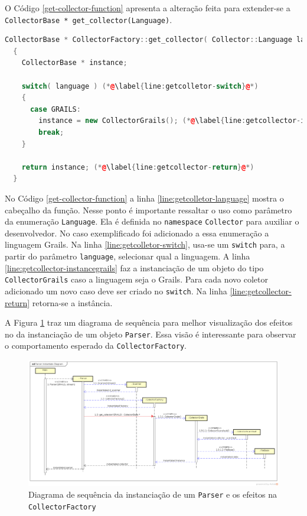 O Código \ref{get-collector-function} apresenta a alteração feita para extender-se
a \lstinline|CollectorBase * get_collector(Language)|.

\begin{lstlisting}[language=C++, label=get-collector-function, caption=Implementação e extensão da \lstinline{get_collector(Language)}]
CollectorBase * CollectorFactory::get_collector( Collector::Language language ) (*@\label{line:getcolletor-language}@*)
  {
    CollectorBase * instance;

    switch( language ) (*@\label{line:getcolletor-switch}@*)
    {
      case GRAILS:
        instance = new CollectorGrails(); (*@\label{line:getcollector-instancegrails}@*)
        break;
    }

    return instance; (*@\label{line:getcollector-return}@*)
  }
\end{lstlisting}

No Código \ref{get-collector-function} a linha \ref{line:getcolletor-language}
mostra o cabeçalho da função. Nesse ponto é importante ressaltar o uso como
parâmetro da enumeração \lstinline|Language|. Ela é definida no \lstinline|namespace|
\lstinline|Collector| para auxiliar o desenvolvedor. No caso exemplificado foi
adicionado a essa enumeração a linguagem \textsf{Grails}. Na linha
\ref{line:getcolletor-switch}, usa-se um \lstinline|switch| para, a partir do parâmetro
\lstinline|language|, selecionar qual a linguagem. A linha
\ref{line:getcollector-instancegrails} faz a instanciação de um objeto do tipo
\lstinline|CollectorGrails| caso a linguagem seja o \textsf{Grails}. Para cada novo
coletor adicionado um novo caso deve ser criado no \lstinline|switch|. Na linha
\ref{line:getcollector-return} retorna-se a instância.

A Figura \ref{parser-instance-sequence-diagram} traz um diagrama de sequência para melhor
visualização dos efeitos no \scarefault da instanciação de um objeto \lstinline|Parser|.
Essa visão é interessante para observar o comportamento esperado da
\lstinline|CollectorFactory|.
\begin{landscape}
\begin{figure}[h]
  \centering
    \includegraphics[width=1.5\textwidth]{figuras/parser-instance-sequence-diagram.png}
    \caption{Diagrama de sequência da instanciação de um \lstinline|Parser| e os efeitos na \lstinline|CollectorFactory|}
    \label{parser-instance-sequence-diagram}
\end{figure}
\FloatBarrier
\end{landscape}

